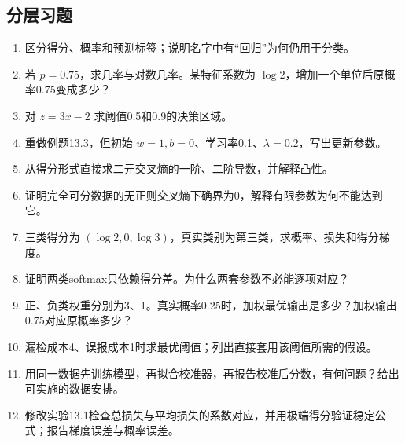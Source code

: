 \documentclass[UTF8,fontset=none,zihao=-4,a4paper]{ctexart}
\numberwithin{equation}{section}
\numberwithin{figure}{section}
\begin{document}
\subsection{分层习题}
\begin{enumerate}[label=13.\arabic*.,before={\interlinepenalty=10000}]
\item 区分得分、概率和预测标签；说明名字中有“回归”为何仍用于分类。
\item 若 $p=0.75$，求几率与对数几率。某特征系数为 $\log2$，增加一个单位后原概率0.75变成多少？
\item 对 $z=3x-2$ 求阈值0.5和0.9的决策区域。
\item 重做例题13.3，但初始 $w=1,b=0$、学习率0.1、$\lambda=0.2$，写出更新参数。
\item 从得分形式直接求二元交叉熵的一阶、二阶导数，并解释凸性。
\item 证明完全可分数据的无正则交叉熵下确界为0，解释有限参数为何不能达到它。
\item 三类得分为 $(\log2,0,\log3)$，真实类别为第三类，求概率、损失和得分梯度。
\item 证明两类softmax只依赖得分差。为什么两套参数不必能逐项对应？
\item 正、负类权重分别为3、1。真实概率0.25时，加权最优输出是多少？加权输出0.75对应原概率多少？
\item 漏检成本4、误报成本1时求最优阈值；列出直接套用该阈值所需的假设。
\item 用同一数据先训练模型，再拟合校准器，再报告校准后分数，有何问题？给出可实施的数据安排。
\item 修改实验13.1检查总损失与平均损失的系数对应，并用极端得分验证稳定公式；报告梯度误差与概率误差。
\end{enumerate}

\clearpage
\end{document}
